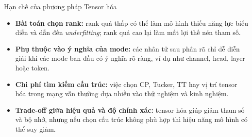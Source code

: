 \begin{frame}{Hạn chế của phương pháp Tensor hóa}
    \begin{itemize}
        \item \textbf{Bài toán chọn rank:}
        rank quá thấp có thể làm mô hình thiếu năng lực biểu diễn và dẫn đến \textit{underfitting};
        rank quá cao lại làm mất lợi thế nén tham số.

        \item \textbf{Phụ thuộc vào ý nghĩa của mode:}
        các nhân tử sau phân rã chỉ dễ diễn giải khi các mode ban đầu có ý nghĩa rõ ràng, ví dụ như channel, head, layer hoặc token.

        \item \textbf{Chi phí tìm kiếm cấu trúc:}
        việc chọn CP, Tucker, TT hay vị trí tensor hóa trong mạng vẫn thường dựa nhiều vào thử nghiệm và kinh nghiệm.

        \item \textbf{Trade-off giữa hiệu quả và độ chính xác:}
        tensor hóa giúp giảm tham số và bộ nhớ, nhưng nếu chọn cấu trúc không phù hợp thì hiệu năng mô hình có thể suy giảm.
    \end{itemize}
\end{frame}

